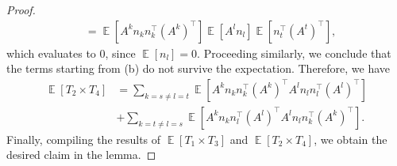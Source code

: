 \documentclass[10pt,a4paper]{amsart}
\DeclareMathOperator{\E}{\mathbb{E}}
\begin{document}
\begin{proof}
\begin{align*}
    &= \E\left[ A^kn_k n_k^{\top} (A^k)^{\top}\right] \E\left[ A^l n_l  \right] \E\left[ n_t^{\top}(A^t)^{\top} \right],
\end{align*}
which evaluates to $0$, since $\E \left [ n_l \right] =0.$ Proceeding similarly, we conclude that the terms starting from (b) do not survive the expectation. Therefore, we have
    \begin{align*}
        \E[T_2 \times T_4] & = \sum_{k=s \neq l=t} \E\left[ A^kn_kn_k^{\top}(A^k)^{\top} A^ln_ln_l^{\top}(A^l)^{\top}\right] \\
        & + \sum_{k=t \neq l=s} \E\left[ A^kn_kn_l^{\top}(A^l)^{\top} A^ln_ln_k^{\top}(A^k)^{\top}\right].
    \end{align*}
    Finally, compiling the results of $\E[T_1 \times T_3]$ and $\E[T_2 \times T_4]$, we obtain the desired claim in the lemma.
\end{proof}
\end{document}
